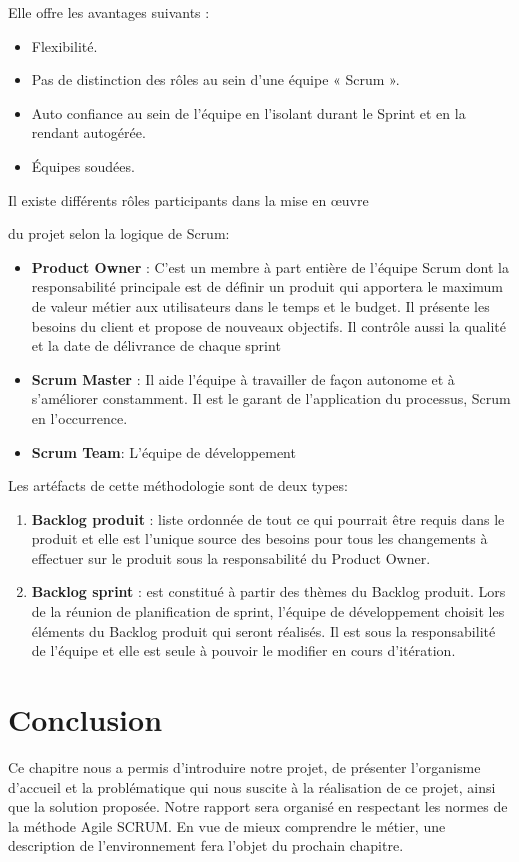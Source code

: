 Elle  offre les avantages suivants : \begin{itemize}
	\item Flexibilité. 
	\item Pas de distinction des rôles au sein d'une équipe « Scrum ». 
	\item Auto confiance au sein de l'équipe en l'isolant durant le Sprint et en la rendant autogérée. 
	\item Équipes soudées. 
	
\end{itemize}

Il existe différents rôles participants dans la mise en \oe{}uvre

 du projet selon la logique de Scrum: 
\begin{itemize}
	\item \textbf {Product Owner } : C'est un membre à part entière de l'équipe Scrum dont la responsabilité principale est de définir un produit qui apportera le maximum de valeur métier aux utilisateurs dans le temps et le budget. Il présente les besoins du client et propose de nouveaux objectifs. Il contrôle aussi la qualité et la date de délivrance de chaque sprint 
	\item \textbf  {Scrum Master }: Il aide  l'équipe à travailler de façon autonome et à s'améliorer constamment. Il est le garant de l'application du processus, Scrum en l'occurrence. 
	\item \textbf { Scrum Team}: L'équipe de développement 
\end{itemize}

Les artéfacts de cette méthodologie sont de deux types: \cite {ref3}

	\begin{enumerate}
		\item \textbf {Backlog produit }: liste ordonnée de tout ce qui pourrait être requis dans le produit et elle est l'unique source des besoins pour tous les changements à effectuer sur le produit sous la responsabilité du Product Owner. 
			\item \textbf {Backlog sprint }: est constitué à partir des thèmes du Backlog produit. Lors de la réunion de planification de sprint, l'équipe de développement choisit les éléments du Backlog produit qui seront réalisés. Il est sous la responsabilité de l'équipe et elle est seule à pouvoir le modifier en cours d'itération. 
	\end{enumerate}



\section{Conclusion}
 Ce chapitre nous a permis d'introduire notre projet, de présenter l'organisme d'accueil  et  la problématique qui nous suscite à la réalisation de ce projet, ainsi que la solution proposée. Notre rapport sera organisé en respectant les normes de la méthode Agile SCRUM.
En vue de mieux comprendre le métier, une description de l'environnement fera l'objet
du prochain chapitre.
